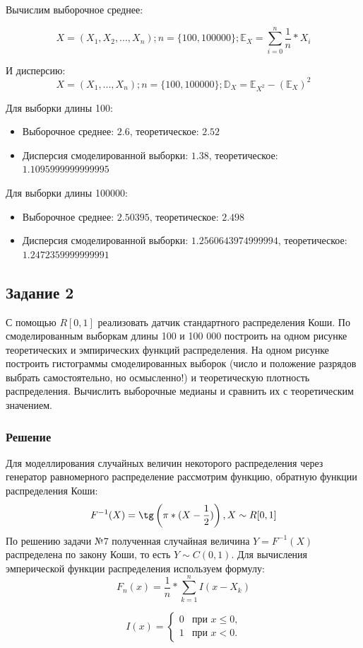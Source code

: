 \documentclass{article}
\begin{document}
Вычислим выборочное среднее:

    \[X = (X_1, X_2, ..., X_n); n = \{100, 100000\}; 
    \mathbb{E}_X = \sum_{i = 0}^{n}\frac{1}{n} * X_i\]

И дисперсию:
    \[X = (X_1, ..., X_n); n = \{100, 100000\};
    \mathbb{D}_X = \mathbb{E}_{X^2} - (\mathbb{E}_X)^2\]

Для выборки длины 100:
\begin{itemize}
    \item Выборочное среднее: $2.6$, теоретическое: $2.52$
    \item Дисперсия смоделированной выборки: $1.38$, теоретическое: $1.1095999999999995$
\end{itemize}

Для выборки длины 100000:
\begin{itemize}
    \item Выборочное среднее: $2.50395$, теоретическое: $2.498$
    \item Дисперсия смоделированной выборки: $1.2560643974999994$, теоретическое: $1.2472359999999991$
\end{itemize}

\subsection{Задание 2}
С помощью $R[0,1]$ реализовать датчик стандартного распределения Коши. По смоделированным выборкам длины 100 и 100 000 построить на одном рисунке теоретических и эмпирических функций распределения. На одном рисунке построить гистограммы смоделированных выборок (число и положение разрядов выбрать самостоятельно, но осмысленно!) и теоретическую плотность распределения. Вычислить выборочные медианы и сравнить их с теоретическим значением.

\subsubsection{Решение}
Для моделлирования случайных величин некоторого распределения через генератор 
равномерного распределение рассмотрим функцию, обратную функции распределения Коши: 
\[ F^{-1}(X) = \tg\left({\pi*(X-\frac{1}{2})}\right), X \sim R[0,1]\]
По решению задачи №7 полученная случайная величина $Y = F^{-1}(X)$ распределена 
по закону Коши, то есть $Y \sim C(0, 1)$. Для вычисления эмперической функции
распределения используем формулу:
\[F_n(x) = \frac{1}{n}*\sum_{k=1}^{n}I(x-X_k)\]

\begin{equation*}
    I(x)=
    \begin{cases}
        0 &\text{при $x \le 0$,}\\
        1 &\text{при $x < 0$.}
    \end{cases}
\end{equation*}
\end{document}
